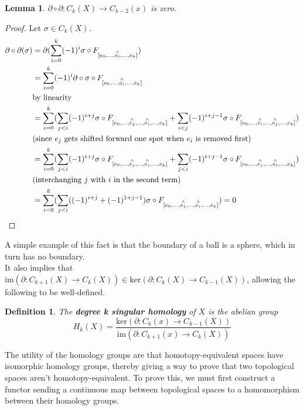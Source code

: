 \documentclass{article}
\newtheorem{definition}[theorem]{Definition}
\newtheorem{lemma}[theorem]{Lemma}
\begin{document}
\begin{lemma}
$\partial\circ\partial\colon C_k(X)\to C_{k-2}(x)$ is zero.
\end{lemma}
\begin{proof}
Let $\sigma\in C_k(X)$.
\begin{align*}
\partial\circ\partial (\sigma)&=\partial(\sum_{i=0}^k(-1)^i\sigma\circ F_{[e_0,...,\overset{\wedge}{e_i},...,e_k]})\\
&=\sum_{i=0}^k(-1)^i\partial\circ\sigma\circ F_{[e_0,...,\overset{\wedge}{e_i},...,e_k]} \\&\text{by linearity}\\
&=\sum_{i=0}^k(\sum_{j<i}(-1)^{i+j}\sigma\circ F_{[e_0,...,\overset{\wedge}{e_j},...,\overset{\wedge}{e_i},...,e_k]} + \sum_{i<j}(-1)^{i+j-1}\sigma\circ F_{[e_0,...,\overset{\wedge}{e_i},...,\overset{\wedge}{e_j},...,e_k]}) \\&\text{(since }e_j \text{ gets shifted forward one spot when }e_i\text{ is removed first)}\\
&=\sum_{i=0}^k(\sum_{j<i}(-1)^{i+j}\sigma\circ F_{[e_0,...,\overset{\wedge}{e_j},...,\overset{\wedge}{e_i},...,e_k]} + \sum_{j<i}(-1)^{i+j-1}\sigma\circ F_{[e_0,...,\overset{\wedge}{e_j},...,\overset{\wedge}{e_i},...,e_k]})
\\&\text{(interchanging }j\text{ with }i\text{ in the second term)}\\
&=\sum_{i=0}^k(\sum_{j<i}((-1)^{i+j}+(-1)^{1+j-1})\sigma\circ F_{[e_0,...,\overset{\wedge}{e_j},...,\overset{\wedge}{e_i},...,e_k]})=0 \qedhere
\end{align*}
\end{proof}

\noindent A simple example of this fact is that the boundary of a ball is a sphere, which in turn has no boundary.\\
It also implies that $\text{im}(\partial:C_{k+1}(X)\rightarrow C_k(X))\in\text{ker}(\partial:C_{k}(X)\rightarrow C_{k-1}(X))$,
allowing the following to be well-defined.
\begin{definition}
The \textbf{degree k singular homology} of $X$ is the abelian group
\[H_k(X)=\frac{\text{ker}(\partial:C_{k}(x)\rightarrow C_{k-1}(X))}{\text{im}(\partial:C_{k+1}(x)\rightarrow C_k(X))}\]
\end{definition}

\noindent The utility of the homology groups are that homotopy-equivalent spaces have isomorphic homology groups, thereby giving a way to prove that two topological spaces aren't homotopy-equivalent. To prove this, we must first construct a functor sending a continuous map between topological spaces to a homomorphism between their homology groups.\\
\end{document}
